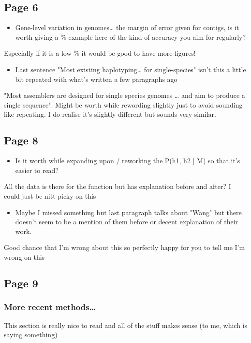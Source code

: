 \documentclass[11pt]{article}
\begin{document}
\subsection{Page 6}
\label{sec-4-2}
\begin{itemize}
\item Gene-level variation in genomes\ldots{} the margin of error given for contigs, is it worth giving a \% example here of the kind of accuracy you aim for regularly?
\end{itemize}
Especially if it is a low \% it would be good to have more figures! 

\begin{itemize}
\item Last sentence "Most existing haplotyping\ldots{} for single-species" isn't this a little bit repeated with what's written a few paragraphs ago
\end{itemize}
"Most assemblers are designed for single species genomes \ldots{} and aim to produce a single sequence". Might be worth while rewording slightly just to 
avoid sounding like repeating. I do realise it's slightly different but sounds very similar.  

\subsection{Page 8}
\label{sec-4-3}
\begin{itemize}
\item Is it worth while expanding upon / reworking the P(h1, h2 | M) so that it's easier to read?
\end{itemize}
All the data is there for the function but has explanation before and after? I could just be nitt picky on this 

\begin{itemize}
\item Maybe I missed something but last paragraph talks about "Wang" but there doesn't seem to be a mention of them before or decent explanation of their work.
\end{itemize}
Good chance that I'm wrong about this so perfectly happy for you to tell me I'm wrong on this

\subsection{Page 9}
\label{sec-4-4}
\subsubsection{More recent methods\ldots{}}
\label{sec-4-4-1}
This section is really nice to read and all of the stuff makes sense (to me, which is saying something)
\end{document}
